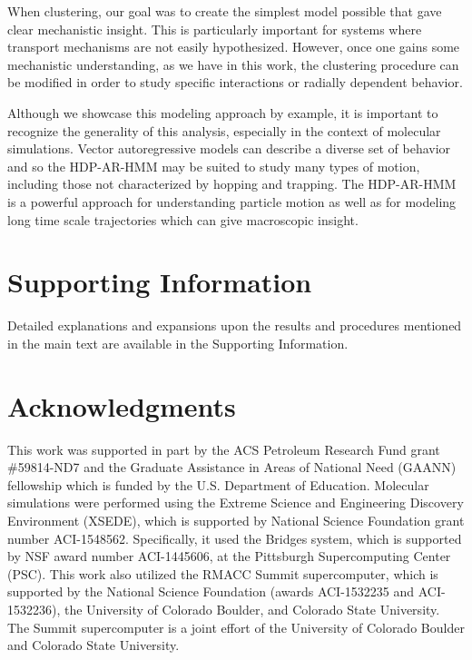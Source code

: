 \documentclass[journal=jpcbfk,manuscript=article]{achemso}
\begin{document}
  When clustering, our goal was to create the simplest model possible that gave
  clear mechanistic insight. This is particularly important for systems where transport mechanisms
  are not easily hypothesized. However, once one gains some mechanistic understanding,
  as we have in this work, the clustering procedure can be modified in order to 
  study specific interactions or radially dependent behavior.
  
  Although we showcase this modeling approach by example, it is important to
  recognize the generality of this analysis, especially in the context of molecular
  simulations. Vector autoregressive models can describe a diverse set of behavior
  and so the HDP-AR-HMM may be suited to study many types of motion, including those not 
  characterized by hopping and trapping. The HDP-AR-HMM is a powerful approach for 
  understanding particle motion as well as for modeling long time scale trajectories
  which can give macroscopic insight.
  
  \section*{Supporting Information}

  Detailed explanations and expansions upon the results and procedures mentioned in
  the main text are available in the Supporting Information. 

  \section*{Acknowledgments}

  This work was supported in part by the ACS Petroleum Research Fund
  grant \#59814-ND7 and the Graduate Assistance in Areas of National Need (GAANN) 
  fellowship which is funded by the U.S. Department of Education. 
  Molecular simulations were performed using the Extreme Science and
  Engineering Discovery Environment (XSEDE), which is supported by National
  Science Foundation grant number ACI-1548562. Specifically, it used the Bridges
  system, which is supported by NSF award number ACI-1445606, at the Pittsburgh
  Supercomputing Center (PSC). This work also utilized the RMACC Summit supercomputer,
  which is supported by the National Science Foundation (awards ACI-1532235 and
  ACI-1532236), the University of Colorado Boulder, and Colorado State
  University. The Summit supercomputer is a joint effort of the University of
  Colorado Boulder and Colorado State University.

  \clearpage

  
  


\end{document}

